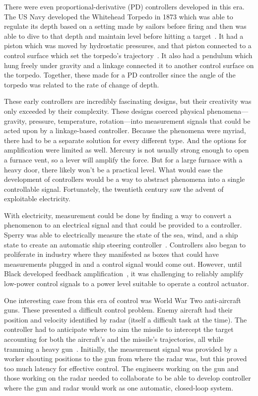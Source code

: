 \documentclass[english,12pt,a4paper,pdftex,eng,utf8]{aaltothesis}
\begin{document}
There were even proportional-derivative (PD) controllers developed in this era.  The US Navy developed the Whitehead Torpedo in 1873 which was able to regulate its depth based on a setting made by sailors before firing and then was able to dive to that depth and maintain level before hitting a target~\cite{Barber1874}.  It had a piston which was moved by hydrostatic pressures, and that piston connected to a control surface which set the torpedo's trajectory~\cite{Sears1873}.  It also had a pendulum which hung freely under gravity and a linkage connected it to another control surface on the torpedo.  Together, these made for a PD controller since the angle of the torpedo was related to the rate of change of depth.

These early controllers are incredibly fascinating designs, but their creativity was only exceeded by their complexity.  These designs coerced physical phenomena---gravity, pressure, temperature, rotation---into measurement signals that could be acted upon by a linkage-based controller.  Because the phenomena were myriad, there had to be a separate solution for every different type.  And the options for amplification were limited as well.  Mercury is not usually strong enough to open a furnace vent, so a lever will amplify the force.  But for a large furnace with a heavy door, there likely won't be a practical level.  What would ease the development of controllers would be a way to abstract phenomena into a single controllable signal.  Fortunately, the twentieth century saw the advent of exploitable electricity.

With electricity, measurement could be done by finding a way to convert a phenomenon to an electrical signal and that could be provided to a controller.  Sperry was able to electrically measure the state of the sea, wind, and a ship state to create an automatic ship steering controller~\cite{Bennett1996}.  Controllers also began to proliferate in industry where they manifested as boxes that could have measurements plugged in and a control signal would come out.  However, until Black developed feedback amplification~\cite{Black1934}, it was challenging to reliably amplify low-power control signals to a power level suitable to operate a control actuator.

One interesting case from this era of control was World War Two anti-aircraft guns.  These presented a difficult control problem.  Enemy aircraft had their position and velocity identified by radar (itself a difficult task at the time).  The controller had to anticipate where to aim the missile to intercept the target accounting for both the aircraft's and the missile's trajectories, all while tramming a heavy gun~\cite{Bennett1996}.  Initially, the measurement signal was provided by a worker shouting positions to the gun from where the radar was, but this proved too much latency for effective control.  The engineers working on the gun and those working on the radar needed to collaborate to be able to develop controller where the gun and radar would work as one automatic, closed-loop system.
\end{document}
